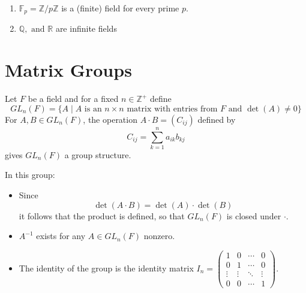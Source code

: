 \documentclass[11pt,a4paper]{article}
\begin{document}
\begin{exa}
    \begin{enumerate}[label=(\roman*)]
        \item \(\mathbb{F}_p = \mathbb{Z} / p \mathbb{Z}\) is a (finite) field for every prime \(p\).
        \item \( \mathbb{Q},\text{ and } \mathbb{R} \) are infinite fields
    \end{enumerate}
    
\end{exa}
  
\section*{Matrix Groups}

Let \( F \) be a   field and for a fixed \( n \in \mathbb{Z}^+ \) define 
\[
GL_n(F) = \{ A \mid A \text{ is an } n \times n \text{ matrix with entries from } F \text{ and } \det(A) \neq 0 \}
\]
For \( A, B \in GL_n(F) \), the operation \( A \cdot B = (C_{ij}) \) defined by 
\[
C_{ij} = \sum_{k=1}^{n} a_{ik}b_{kj}
\]
gives  \( GL_n(F) \) a group structure. 

\begin{rem}
    In this group:
\begin{itemize}
    \item Since
\[
\det(A \cdot B) = \det(A) \cdot \det(B)
\]
it follows that the product is defined, so that \(GL_n(F)\) is closed under \(\cdot\).    
    \item \( A^{-1} \) exists for any \(A\in GL_n(F)\) nonzero.
    \item The identity of the group is the identity matrix \(  I_n = \begin{pmatrix} 1 & 0 & \cdots & 0 \\ 0 & 1 & \cdots & 0 \\ \vdots & \vdots & \ddots & \vdots \\ 0 & 0 & \cdots & 1 \end{pmatrix}  \).
\end{itemize}

\end{rem}
\end{document}
